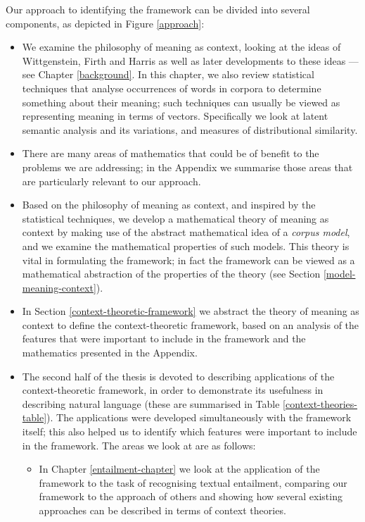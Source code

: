 Our approach to identifying the framework can be divided into several components, as depicted in Figure \ref{approach}:
\begin{itemize}
\item We examine the philosophy of meaning as context, looking at the ideas of Wittgenstein, Firth and Harris as well as later developments to these ideas --- see Chapter \ref{background}. In this chapter, we also review statistical techniques that analyse occurrences of words in corpora to determine something about their meaning; such techniques can usually be viewed as representing meaning in terms of vectors. Specifically we look at latent semantic analysis and its variations, and measures of distributional similarity.
\item There are many areas of mathematics that could be of benefit to the problems we are addressing; in the Appendix we summarise those areas that are particularly relevant to our approach.
\item Based on the philosophy of meaning as context, and inspired by the statistical techniques, we develop a mathematical theory of meaning as context by making use of the abstract mathematical idea of a \emph{corpus model}, and we examine the mathematical properties of such models. This theory is vital in formulating the framework; in fact the framework can be viewed as a mathematical abstraction of the properties of the theory (see Section \ref{model-meaning-context}).
\item In Section \ref{context-theoretic-framework} we abstract the theory of meaning as context to define the context-theoretic framework, based on an analysis of the features that were important to include in the framework and the mathematics presented in the Appendix.
\item The second half of the thesis is devoted to describing applications of the context-theoretic framework, in order to demonstrate its usefulness in describing natural language (these are summarised in Table \ref{context-theories-table}). The applications were developed simultaneously with the framework itself; this also helped us to identify which features were important to include in the framework. The areas we look at are as follows:
\begin{itemize}
\item In Chapter \ref{entailment-chapter} we look at the application of the framework to the task of recognising textual entailment, comparing our framework to the approach of others and showing how several existing approaches can be described in terms of context theories.

\end{itemize}
\end{itemize}
